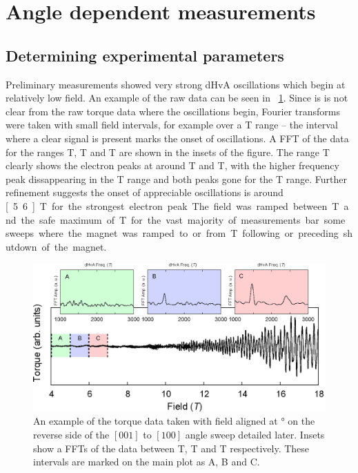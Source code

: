 
\section{Angle dependent measurements}
    \label{Sec:3:AngleDependentMeasurements}

\subsection{Determining experimental parameters}

Preliminary measurements showed very strong dHvA oscillations which begin at relatively low field.  An example of the raw data can be seen in \fig~\ref{Fig:3:RawOscillations}. Since is is not clear from the raw torque data where the oscillations begin, Fourier transforms were taken with small field intervals, for example over a \unit[1]{T} range -- the interval where a clear signal is present marks the onset of oscillations. A FFT of the data for the ranges \unit[4-5]{T}, \unit[5-6]{T} and \unit[6-7]{T} are shown in the insets of the figure. The range \unit[6-7]{T} clearly shows the electron peaks at around \unit[1500]{T} and \unit[2450]{T}, with the higher frequency peak dissappearing in the \unit[5-6]{T} range and both peaks gone for the \unit[4-5]{T} range. Further refinement suggests the onset of appreciable oscillations is around \unit[5.6]{T} for the strongest electron peak. The field was ramped between \unit[6]{T} and the safe maximum of \unit[18]{T} for the vast majority of measurements bar some sweeps where the magnet was ramped to or from \unit[0]{T} following or preceding shutdown of the magnet.
\begin{figure}[h!]
    \begin{center}
        \includegraphics[scale=0.7]{Chapter3-dHvABaFe2P2/Figures/AngleDepMeasurements/RawOscillations/RawOscillations}
        \caption{An example of the torque data taken with field aligned at \unit[26]{\degree} on the reverse side of the $[001]$ to $[100]$ angle sweep detailed later. Insets show a FFTs of the data between \unit[4-5]{T}, \unit[5-6]{T} and \unit[6-7]{T} respectively. These intervals are marked on the main plot as A, B and C.}
        \label{Fig:3:RawOscillations}
    \end{center}
\end{figure}

